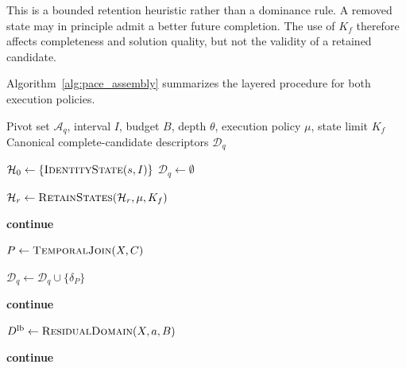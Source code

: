 \documentclass[a4paper,fleqn]{cas-dc}
\begin{document}
This is a bounded retention heuristic rather than a dominance rule. A removed
state may in principle admit a better future completion. The use of \(K_f\)
therefore affects completeness and solution quality, but not the validity of a
retained candidate.

Algorithm~\ref{alg:pace_assembly} summarizes the layered procedure for both
execution policies.

\begin{algorithm}[t]
\caption{\textsc{AssembleCandidates}}
\label{alg:pace_assembly}
\begin{algorithmic}[1]
\Require Pivot set \(\mathcal A_q\), interval \(I\), budget \(B\),
depth \(\theta\), execution policy \(\mu\), state limit \(K_f\)
\Ensure Canonical complete-candidate descriptors \(\mathcal D_q\)

\State \(\mathcal H_0\gets
       \{\textsc{IdentityState}(s,I)\}\)
\State \(\mathcal D_q\gets\emptyset\)


    \State
    \(\mathcal H_r\gets
    \textsc{RetainStates}(\mathcal H_r,\mu,K_f)\)



                \State \textbf{continue}
            \EndIf

            \State
            \(P\gets\textsc{TemporalJoin}(X,C)\)

                \State
                \(\mathcal D_q
                \gets
                \mathcal D_q\cup\{\delta_P\}\)
            \EndIf

        \EndFor

            \State \textbf{continue}
        \EndIf


            \State
            \(D^{\mathrm{lb}}
            \gets
            \textsc{ResidualDomain}(X,a,B)\)

                \State \textbf{continue}
            \EndIf



\end{algorithmic}
\end{algorithm}
\end{document}
